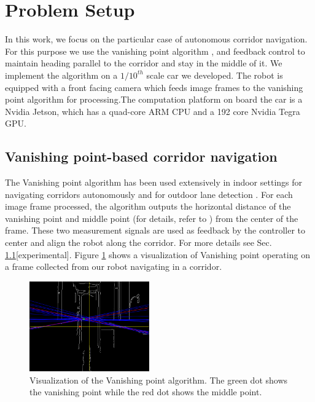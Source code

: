 \section{Problem Setup}

In this work, we focus on the particular case of autonomous corridor navigation. For this purpose we use the vanishing point algorithm \cite{VP1}, \cite{VP2} and feedback control to maintain heading parallel to the corridor and stay in the middle of it. We implement the algorithm on a $1/10^{th}$ scale car we developed. The robot is equipped with a front facing camera which feeds image frames to the vanishing point algorithm for processing.The computation platform on board the car is a Nvidia Jetson, which has a quad-core ARM CPU and a 192 core Nvidia Tegra GPU.


\subsection{Vanishing point-based corridor navigation}

The Vanishing point algorithm \cite{VP1} has been used extensively in indoor settings for navigating corridors autonomously \cite{VP2, VP3} and for outdoor lane detection \cite{gallagher2002ground}.
For each image frame processed, the algorithm outputs the horizontal distance of the vanishing point and middle point (for details, refer to \cite{VP1}) from the center of the frame. These two measurement signals are used as feedback by the controller to center and align the robot along the corridor. For more details see Sec. \ref{}[experimental]. Figure \ref{fig:vp_viz} shows a visualization of Vanishing point operating on a frame collected from our robot navigating in a corridor.

\begin{figure}[hbtp]
\centering
\includegraphics[width=0.46\textwidth]{Figs/vpmpimages/image_23_-30_-51.png}
\caption{Visualization of the Vanishing point algorithm. The green dot shows the vanishing point while the red dot shows the middle point.}
\label{fig:vp_viz} %
\end{figure}


